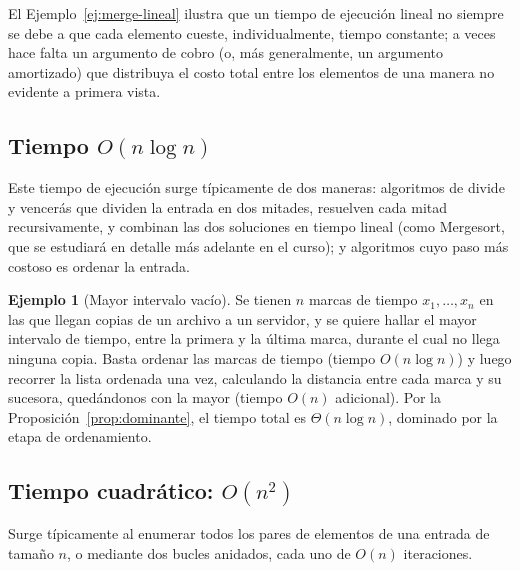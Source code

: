 \documentclass[12pt, spanish, oneside, openany]{book}
\theoremstyle{uprightplain}
\theoremstyle{definition}
\newtheorem{ejemplo}[teorema]{Ejemplo}
\theoremstyle{remark}
\theoremstyle{definition}
\begin{document}
El Ejemplo~\ref{ej:merge-lineal} ilustra que un tiempo de ejecución lineal no siempre se debe a que cada elemento cueste, individualmente, tiempo constante; a veces hace falta un argumento de cobro (o, más generalmente, un argumento amortizado) que distribuya el costo total entre los elementos de una manera no evidente a primera vista.

\subsection{Tiempo $O(n\log n)$}

Este tiempo de ejecución surge típicamente de dos maneras: algoritmos de divide y vencerás que dividen la entrada en dos mitades, resuelven cada mitad recursivamente, y combinan las dos soluciones en tiempo lineal (como Mergesort, que se estudiará en detalle más adelante en el curso); y algoritmos cuyo paso más costoso es ordenar la entrada.

\begin{ejemplo}[Mayor intervalo vacío]
\label{ej:intervalo-vacio}
Se tienen $n$ marcas de tiempo $x_1,\dots,x_n$ en las que llegan copias de un archivo a un servidor, y se quiere hallar el mayor intervalo de tiempo, entre la primera y la última marca, durante el cual no llega ninguna copia. Basta ordenar las marcas de tiempo (tiempo $O(n\log n)$) y luego recorrer la lista ordenada una vez, calculando la distancia entre cada marca y su sucesora, quedándonos con la mayor (tiempo $O(n)$ adicional). Por la Proposición~\ref{prop:dominante}, el tiempo total es $\Theta(n\log n)$, dominado por la etapa de ordenamiento.
\end{ejemplo}

\subsection{Tiempo cuadrático: $O(n^2)$}

Surge típicamente al enumerar todos los pares de elementos de una entrada de tamaño $n$, o mediante dos bucles anidados, cada uno de $O(n)$ iteraciones.
\end{document}
